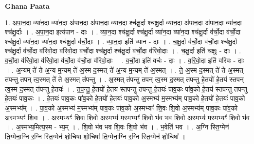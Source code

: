 \documentclass[17pt]{extarticle}
\begin{document}
\textbf{Ghana Paata } \newline

1. अ॒पा॒न॒दा व्या॑न॒दा व्या॑न॒दा अ॑पान॒दा अ॑पान॒दा व्या॑न॒दा श्च॑क्षु॒र्दा श्च॑क्षु॒र्दा व्या॑न॒दा अ॑पान॒दा अ॑पान॒दा व्या॑न॒दा श्च॑क्षु॒र्दाः । . अ॒पा॒न॒दा इत्य॑पान - दाः । . व्या॒न॒दा श्च॑क्षु॒र्दा श्च॑क्षु॒र्दा व्या॑न॒दा व्या॑न॒दा श्च॑क्षु॒र्दा व॑र्चो॒दा व॑र्चो॒दा श्च॑क्षु॒र्दा व्या॑न॒दा व्या॑न॒दा श्च॑क्षु॒र्दा व॑र्चो॒दाः । . व्या॒न॒दा इति॑ व्यान - दाः । . च॒क्षु॒र्दा व॑र्चो॒दा व॑र्चो॒दा श्च॑क्षु॒र्दा श्च॑क्षु॒र्दा व॑र्चो॒दा व॑रिवो॒दा व॑रिवो॒दा व॑र्चो॒दा श्च॑क्षु॒र्दा श्च॑क्षु॒र्दा व॑र्चो॒दा व॑रिवो॒दाः । . च॒क्षु॒र्दा इति॑ चक्षुः - दाः । . व॒र्चो॒दा व॑रिवो॒दा व॑रिवो॒दा व॑र्चो॒दा व॑र्चो॒दा व॑रिवो॒दाः । . व॒र्चो॒दा इति॑ वर्चः - दाः । . व॒रि॒वो॒दा इति॑ वरिवः - दाः । . अ॒न्यम् ते॑ ते अ॒न्य म॒न्यम् ते॑ अ॒स्म द॒स्मत् ते॑ अ॒न्य म॒न्यम् ते॑ अ॒स्मत् । . ते॒ अ॒स्म द॒स्मत् ते॑ ते अ॒स्मत् त॑पन्तु तपन् त्व॒स्मत् ते॑ ते अ॒स्मत् त॑पन्तु । . अ॒स्मत् त॑पन्तु तपन् त्व॒स्म द॒स्मत् त॑पन्तु हे॒तयो॑ हे॒तय॑ स्तपन् त्व॒स्म द॒स्मत् त॑पन्तु हे॒तयः॑ । . त॒प॒न्तु॒ हे॒तयो॑ हे॒तय॑ स्तपन्तु तपन्तु हे॒तयः॑ पाव॒कः पा॑व॒को हे॒तय॑ स्तपन्तु तपन्तु हे॒तयः॑ पाव॒कः । . हे॒तयः॑ पाव॒कः पा॑व॒को हे॒तयो॑ हे॒तयः॑ पाव॒को अ॒स्मभ्य॑ म॒स्मभ्य॑म् पाव॒को हे॒तयो॑ हे॒तयः॑ पाव॒को अ॒स्मभ्य᳚म् । . पा॒व॒को अ॒स्मभ्य॑ म॒स्मभ्य॑म् पाव॒कः पा॑व॒को अ॒स्मभ्यꣳ॑ शि॒वः शि॒वो अ॒स्मभ्य॑म् पाव॒कः पा॑व॒को अ॒स्मभ्यꣳ॑ शि॒वः । . अ॒स्मभ्यꣳ॑ शि॒वः शि॒वो अ॒स्मभ्य॑ म॒स्मभ्यꣳ॑ शि॒वो भ॑व भव शि॒वो अ॒स्मभ्य॑ म॒स्मभ्यꣳ॑ शि॒वो भ॑व । . अ॒स्मभ्य॒मित्य॒स्म - भ्य॒म् । . शि॒वो भ॑व भव शि॒वः शि॒वो भ॑व । . भ॒वेति॑ भव । . अ॒ग्नि स्ति॒ग्मेन॑ ति॒ग्मेना॒ग्नि र॒ग्नि स्ति॒ग्मेन॑ शो॒चिषा॑ शो॒चिषा॑ ति॒ग्मेना॒ग्नि र॒ग्नि स्ति॒ग्मेन॑ शो॒चिषा᳚ । \newline
\end{document}

